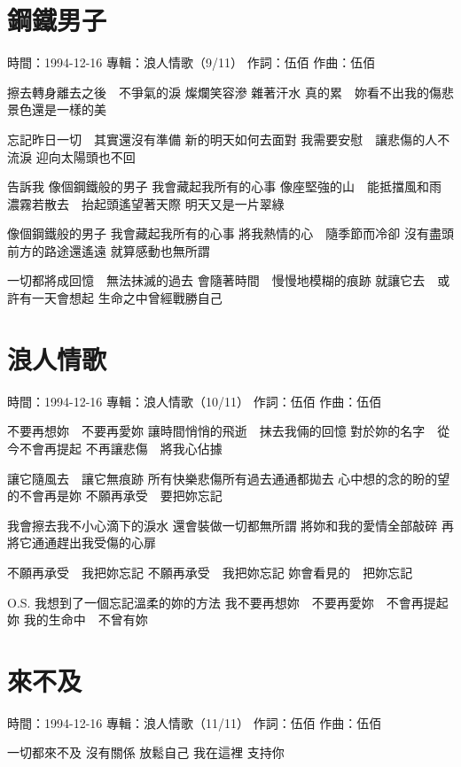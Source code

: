 \documentclass[UTF8,a4paper,oneside,twocolumn,12pt]{ctexbook}
\newcommand{\infopair}[2]{\textbullet #1：#2}
\newcommand{\zc}[1][伍佰]{\infopair{作詞}{#1}}
\newcommand{\zq}[1][伍佰]{\infopair{作曲}{#1}}
\newcommand{\zj}[1]{\infopair{專輯}{#1}}
\newcommand{\sj}[1]{\infopair{時間}{#1}}
\newenvironment{info}{\begin{flushleft}\kaishu
	}
	{\end{flushleft}\normalsize\yahei\par}
\newenvironment{lyric}{
	}
{}
\begin{document}
\section{鋼鐵男子}
\begin{info}
	\sj{1994-12-16}
	\zj{浪人情歌（9/11）}
	\zc
	\zq
\end{info}
\begin{lyric}
	擦去轉身離去之後　不爭氣的淚
	燦爛笑容滲 雜著汗水
	真的累　妳看不出我的傷悲
	景色還是一樣的美

	忘記昨日一切　其實還沒有準備
	新的明天如何去面對
	我需要安慰　讓悲傷的人不流淚
	迎向太陽頭也不回

	告訴我
	像個鋼鐵般的男子
	我會藏起我所有的心事
	像座堅強的山　能抵擋風和雨
	濃霧若散去　抬起頭遙望著天際
	明天又是一片翠綠

	像個鋼鐵般的男子
	我會藏起我所有的心事
	將我熱情的心　隨季節而冷卻
	沒有盡頭　前方的路途還遙遠
	就算感動也無所謂

	一切都將成回憶　無法抹滅的過去
	會隨著時間　慢慢地模糊的痕跡
	就讓它去　或許有一天會想起
	生命之中曾經戰勝自己
\end{lyric}

\section{浪人情歌}
\begin{info}
	\sj{1994-12-16}
	\zj{浪人情歌（10/11）}
	\zc
	\zq
\end{info}
\begin{lyric}
	不要再想妳　不要再愛妳
	讓時間悄悄的飛逝　抹去我倆的回憶
	對於妳的名字　從今不會再提起
	不再讓悲傷　將我心佔據

	讓它隨風去　讓它無痕跡
	所有快樂悲傷所有過去通通都拋去
	心中想的念的盼的望的不會再是妳
	不願再承受　要把妳忘記

	我會擦去我不小心滴下的淚水
	還會裝做一切都無所謂
	將妳和我的愛情全部敲碎
	再將它通通趕出我受傷的心扉

	不願再承受　我把妳忘記
	不願再承受　我把妳忘記
	妳會看見的　把妳忘記

	O.S. 我想到了一個忘記溫柔的妳的方法
	我不要再想妳　不要再愛妳　不會再提起妳
	我的生命中　不曾有妳
\end{lyric}

\section{來不及}
\begin{info}
	\sj{1994-12-16}
	\zj{浪人情歌（11/11）}
	\zc
	\zq
\end{info}
\begin{lyric}
	一切都來不及
	沒有關係
	放鬆自己
	我在這裡
	支持你
\end{lyric}
\end{document}
